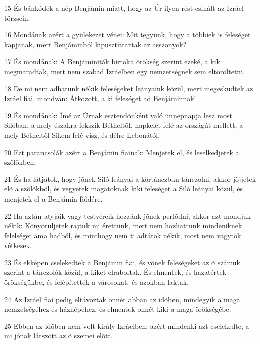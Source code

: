 \par 15 És bánkódék a nép Benjámin miatt, hogy az Úr ilyen rést csinált az Izráel törzsein.
\par 16 Mondának azért a gyülekezet vénei: Mit tegyünk, hogy a többiek is feleséget kapjanak, mert Benjáminból kipusztíttattak az asszonyok?
\par 17 És mondának: A Benjáminiták birtoka örökség szerint ezeké, a kik megmaradtak, mert nem szabad Izráelben egy nemzetségnek sem eltöröltetni.
\par 18 De mi nem adhatunk nékik feleségeket leányaink közül, mert megesküdtek az Izráel fiai, mondván: Átkozott, a ki feleséget ad Benjáminnak!
\par 19 És mondának: Ímé az Úrnak esztendõnként való ünnepnapja lesz most Silóban, a mely északra fekszik Bétheltõl, napkelet felé az országút mellett, a mely Bétheltõl Sikem felé visz, és délre Lebonától.
\par 20 Ezt parancsolák azért a Benjámin fiainak: Menjetek el, és leselkedjetek a szõlõkben.
\par 21 És ha látjátok, hogy jõnek Siló leányai a körtánczban tánczolni, akkor jõjjetek elõ a szõlõkbõl, és vegyetek magatoknak kiki feleséget a Siló leányai közül, és menjetek el a Benjámin földére.
\par 22 Ha aztán atyjaik vagy testvéreik hozzánk jõnek perlõdni, akkor azt mondjuk nékik: Könyörüljetek rajtuk mi érettünk, mert nem hozhattunk mindeniknek felelséget ama hadból, és minthogy nem ti adtátok nékik, most nem vagytok vétkesek.
\par 23 És ekképen cselekedtek a Benjámin fiai, és võnek feleségeket az õ számuk szerint a tánczolók közül, a kiket elraboltak. És elmentek, és hazatértek örökségükbe, és felépítették a városokat, és azokban laktak.
\par 24 Az Izráel fiai pedig eltávoztak onnét abban az idõben, mindegyik a maga nemzetségéhez és háznépéhez, és elmentek onnét kiki a maga örökségébe.
\par 25 Ebben az idõben nem volt király Izráelben; azért mindenki azt cselekedte, a mi jónak látszott az õ szemei elõtt.


